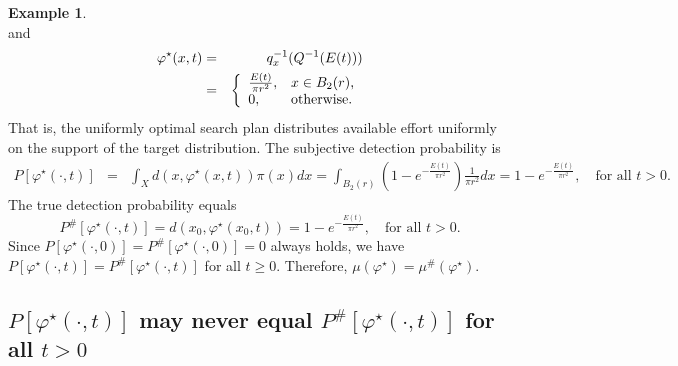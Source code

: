 \documentclass[12pt]{article}
\theoremstyle{plain}
\theoremstyle{definition}
\newtheorem{example}{Example}%
\theoremstyle{remark}
\begin{document}
\begin{example}
\[\]
and 
\begin{eqnarray*}
\varphi^\star(x, t)&=&
q_x^{-1}(Q^{-1}(E(t)))\\
&=&\left\{
		                           \begin{array}{ll}
		                         \frac{E(t)}{\pi r^2}, & \hbox{$x\in B_2(r)$,} \\
					0,  & \hbox{otherwise.} 
		                          \end{array}
		                         \right.		                         
\end{eqnarray*}
That is,  the uniformly optimal search plan distributes available effort uniformly on the support of the target distribution.  The subjective detection probability is 
\begin{eqnarray*}
P[\varphi^\star(\cdot, t)] &=& \int_X d(x, \varphi^\star(x, t)) \pi(x)dx=\int_{B_2(r)} \left(1-e^{-\frac{E(t)}{\pi r^2}}\right)\frac{1}{\pi r^2}dx=1-e^{-\frac{E(t)}{\pi r^2}}, \quad \text{for all $t>0$}.
\end{eqnarray*}
The true detection probability equals
\[
P^{\#}[\varphi^\star(\cdot, t)]=d(x_0, \varphi^\star(x_0, t))=1-e^{-\frac{E(t)}{\pi r^2}}, \quad \text{for all $t>0$}.
\]
Since $P[\varphi^\star(\cdot, 0)]=P^{\#}[\varphi^\star(\cdot, 0)]=0$ always holds,  we have $P[\varphi^\star(\cdot, t)]=P^{\#}[\varphi^\star(\cdot, t)]$ for all $t\geq 0$.  Therefore,  $\mu(\varphi^\star)=\mu^{\#}(\varphi^\star)$.
\end{example}



\subsection{$P[\varphi^\star(\cdot, t)]$ may never equal $P^{\#}[\varphi^\star(\cdot, t)]$ for all $t> 0$}


\medskip
\end{document}
